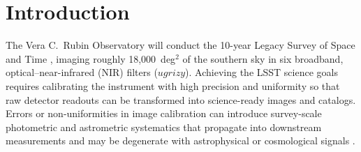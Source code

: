 \section{Introduction} \label{sec:intro}

The Vera C.\ Rubin Observatory will conduct the 10-year Legacy Survey of Space and Time \citep[LSST,][]{2019ApJ...873..111I}, imaging roughly 18,000~deg$^{2}$ of the southern sky in six broadband, optical--near-infrared (NIR) filters ($ugrizy$).
Achieving the LSST science goals requires calibrating the instrument with high precision and uniformity so that raw detector readouts can be transformed into science-ready images and catalogs.
Errors or non-uniformities in image calibration can introduce survey-scale photometric and astrometric systematics that propagate into downstream measurements and may be degenerate with astrophysical or cosmological signals \citep{2023PASP..135k5003E}.

